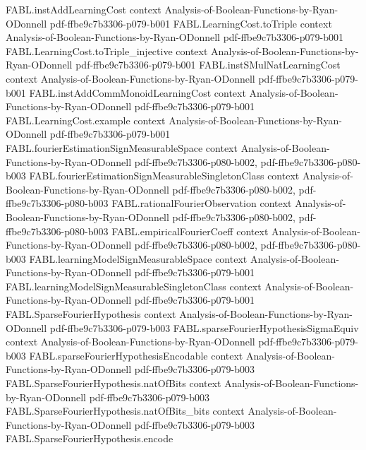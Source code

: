 \begin{theorem}
  {FABL.instAddLearningCost}
  {context}
  {Analysis-of-Boolean-Functions-by-Ryan-ODonnell}
  {pdf-ffbe9c7b3306-p079-b001}
\proofstep
  {FABL.LearningCost.toTriple}
  {context}
  {Analysis-of-Boolean-Functions-by-Ryan-ODonnell}
  {pdf-ffbe9c7b3306-p079-b001}
\proofstep
  {FABL.LearningCost.toTriple_injective}
  {context}
  {Analysis-of-Boolean-Functions-by-Ryan-ODonnell}
  {pdf-ffbe9c7b3306-p079-b001}
\proofstep
  {FABL.instSMulNatLearningCost}
  {context}
  {Analysis-of-Boolean-Functions-by-Ryan-ODonnell}
  {pdf-ffbe9c7b3306-p079-b001}
\proofstep
  {FABL.instAddCommMonoidLearningCost}
  {context}
  {Analysis-of-Boolean-Functions-by-Ryan-ODonnell}
  {pdf-ffbe9c7b3306-p079-b001}
\proofstep
  {FABL.LearningCost.example}
  {context}
  {Analysis-of-Boolean-Functions-by-Ryan-ODonnell}
  {pdf-ffbe9c7b3306-p079-b001}
\proofstep
  {FABL.fourierEstimationSignMeasurableSpace}
  {context}
  {Analysis-of-Boolean-Functions-by-Ryan-ODonnell}
  {pdf-ffbe9c7b3306-p080-b002,
    pdf-ffbe9c7b3306-p080-b003}
\proofstep
  {FABL.fourierEstimationSignMeasurableSingletonClass}
  {context}
  {Analysis-of-Boolean-Functions-by-Ryan-ODonnell}
  {pdf-ffbe9c7b3306-p080-b002,
    pdf-ffbe9c7b3306-p080-b003}
\proofstep
  {FABL.rationalFourierObservation}
  {context}
  {Analysis-of-Boolean-Functions-by-Ryan-ODonnell}
  {pdf-ffbe9c7b3306-p080-b002,
    pdf-ffbe9c7b3306-p080-b003}
\proofstep
  {FABL.empiricalFourierCoeff}
  {context}
  {Analysis-of-Boolean-Functions-by-Ryan-ODonnell}
  {pdf-ffbe9c7b3306-p080-b002,
    pdf-ffbe9c7b3306-p080-b003}
\proofstep
  {FABL.learningModelSignMeasurableSpace}
  {context}
  {Analysis-of-Boolean-Functions-by-Ryan-ODonnell}
  {pdf-ffbe9c7b3306-p079-b001}
\proofstep
  {FABL.learningModelSignMeasurableSingletonClass}
  {context}
  {Analysis-of-Boolean-Functions-by-Ryan-ODonnell}
  {pdf-ffbe9c7b3306-p079-b001}
\proofstep
  {FABL.SparseFourierHypothesis}
  {context}
  {Analysis-of-Boolean-Functions-by-Ryan-ODonnell}
  {pdf-ffbe9c7b3306-p079-b003}
\proofstep
  {FABL.sparseFourierHypothesisSigmaEquiv}
  {context}
  {Analysis-of-Boolean-Functions-by-Ryan-ODonnell}
  {pdf-ffbe9c7b3306-p079-b003}
\proofstep
  {FABL.sparseFourierHypothesisEncodable}
  {context}
  {Analysis-of-Boolean-Functions-by-Ryan-ODonnell}
  {pdf-ffbe9c7b3306-p079-b003}
\proofstep
  {FABL.SparseFourierHypothesis.natOfBits}
  {context}
  {Analysis-of-Boolean-Functions-by-Ryan-ODonnell}
  {pdf-ffbe9c7b3306-p079-b003}
\proofstep
  {FABL.SparseFourierHypothesis.natOfBits_bits}
  {context}
  {Analysis-of-Boolean-Functions-by-Ryan-ODonnell}
  {pdf-ffbe9c7b3306-p079-b003}
\proofstep
  {FABL.SparseFourierHypothesis.encode}

\end{theorem}
